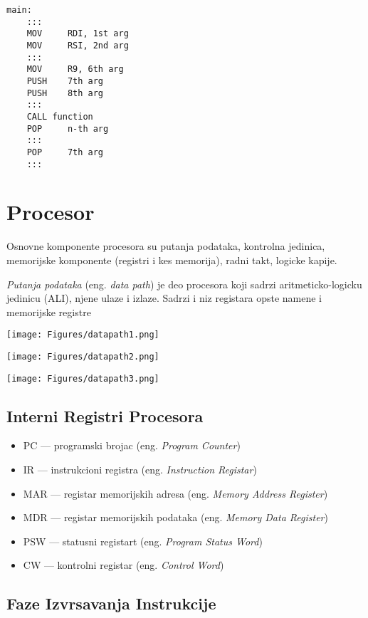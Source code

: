 \documentclass[12p,a4paper]{article}
\begin{document}
\begin{multicols}{2}
\begin{lstlisting}
main:
    :::
    MOV     RDI, 1st arg
    MOV     RSI, 2nd arg 
    :::
    MOV     R9, 6th arg
    PUSH    7th arg
    PUSH    8th arg
    :::
    CALL function
    POP     n-th arg
    :::
    POP     7th arg
    :::
    \end{lstlisting}
    
    \section{Procesor}
    
    Osnovne komponente procesora su putanja podataka, kontrolna jedinica, 
    memorijske komponente (registri i kes memorija), radni takt, logicke 
    kapije.

    \emph{Putanja podataka} (eng. \emph{data path}) je deo procesora koji 
    sadrzi aritmeticko-logicku jedinicu (ALI), njene ulaze i izlaze. Sadrzi
    i niz registara opste namene i memorijske registre

    \texttt{[image: Figures/datapath1.png]}

    \texttt{[image: Figures/datapath2.png]}

    \texttt{[image: Figures/datapath3.png]}

    \subsection{Interni Registri Procesora}

    \begin{itemize}
        \itemsep0em
        \item PC --- programski brojac (eng. \emph{Program Counter})
        \item IR --- instrukcioni registra 
            (eng. \emph{Instruction Registar})   
        \item MAR --- registar memorijskih adresa 
            (eng. \emph{Memory Address Register})
        \item MDR --- registar memorijskih podataka
            (eng. \emph{Memory Data Register})
        \item PSW --- statusni registart (eng. \emph{Program Status Word})
        \item CW --- kontrolni registar (eng. \emph{Control Word})
    \end{itemize}

    \subsection{Faze Izvrsavanja Instrukcije}


\end{multicols}
\end{document}
